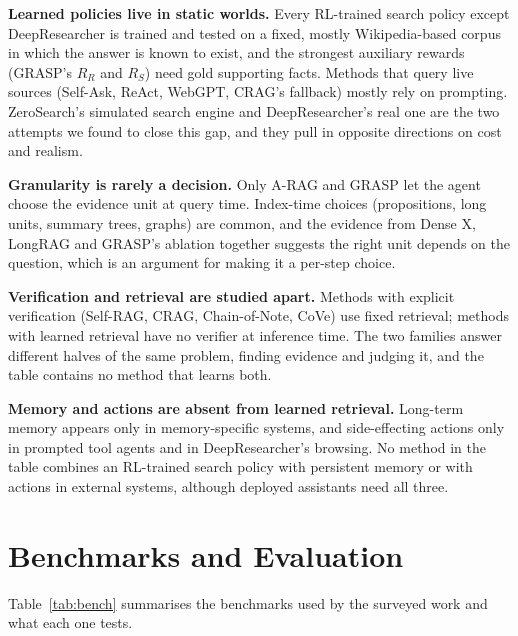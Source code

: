 \documentclass[pdflatex,sn-mathphys-num]{sn-jnl}%
\begin{document}
\textbf{Learned policies live in static worlds.} Every RL-trained search policy except DeepResearcher is trained and tested on a fixed, mostly Wikipedia-based corpus in which the answer is known to exist, and the strongest auxiliary rewards (GRASP's $R_R$ and $R_S$) need gold supporting facts. Methods that query live sources (Self-Ask, ReAct, WebGPT, CRAG's fallback) mostly rely on prompting. ZeroSearch's simulated search engine and DeepResearcher's real one are the two attempts we found to close this gap, and they pull in opposite directions on cost and realism.

\textbf{Granularity is rarely a decision.} Only A-RAG and GRASP let the agent choose the evidence unit at query time. Index-time choices (propositions, long units, summary trees, graphs) are common, and the evidence from Dense X, LongRAG and GRASP's ablation together suggests the right unit depends on the question, which is an argument for making it a per-step choice.

\textbf{Verification and retrieval are studied apart.} Methods with explicit verification (Self-RAG, CRAG, Chain-of-Note, CoVe) use fixed retrieval; methods with learned retrieval have no verifier at inference time. The two families answer different halves of the same problem, finding evidence and judging it, and the table contains no method that learns both.

\textbf{Memory and actions are absent from learned retrieval.} Long-term memory appears only in memory-specific systems, and side-effecting actions only in prompted tool agents and in DeepResearcher's browsing. No method in the table combines an RL-trained search policy with persistent memory or with actions in external systems, although deployed assistants need all three.

\section{Benchmarks and Evaluation}
\label{sec:eval}

Table~\ref{tab:bench} summarises the benchmarks used by the surveyed work and what each one tests.
\end{document}
